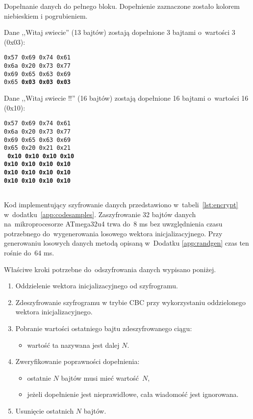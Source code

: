 \begin{table}[th]
\centering
\caption{Dopełnanie danych do pełnego bloku. Dopełnienie zaznaczone zostało kolorem niebieskiem i pogrubieniem.}
{\footnotesize Dane ,,Witaj swiecie'' (13 bajtów) zostają dopełnione 3 bajtami o~wartości 3 (0x03):}

\texttt{0x57 0x69 0x74 0x61\\
0x6a 0x20 0x73 0x77\\
0x69 0x65 0x63 0x69\\
0x65 {\color[rgb]{0,0,1}\bfseries 0x03 0x03 0x03}}

{\footnotesize Dane ,,Witaj swiecie !!'' (16 bajtów) zostają dopełnione 16 bajtami o~wartości 16 (0x10):}

\texttt{0x57 0x69 0x74 0x61\\
0x6a 0x20 0x73 0x77\\
0x69 0x65 0x63 0x69\\
0x65 0x20 0x21 0x21\\
{\color[rgb]{0,0,1}\bfseries
0x10 0x10 0x10 0x10\\
0x10 0x10 0x10 0x10\\
0x10 0x10 0x10 0x10\\
0x10 0x10 0x10 0x10\\
}
}

\label{tab:padding}
\end{table}

Kod implementujący szyfrowanie danych przedstawiono w~tabeli~\ref{lst:encrypt} w~dodatku~\ref{app:codesamples}. Zaszyfrowanie 32 bajtów danych na~mikroprocesorze ATmega32u4 trwa do~8 ms bez uwzględnienia czasu potrzebnego do~wygenerowania losowego wektora inicjalizacyjnego. Przy generowaniu losowych danych metodą opisaną w~Dodatku \ref{app:randgen} czas ten rośnie do~64 ms.

Właściwe kroki potrzebne do~odszyfrowania danych wypisano poniżej.

\begin{enumerate}
\item Oddzielenie wektora inicjalizacyjnego od szyfrogramu.
\item Zdeszyfrowanie szyfrogramu w trybie CBC przy wykorzystaniu oddzielonego wektora inicjalizacyjnego.
\item Pobranie wartości ostatniego bajtu zdeszyfrowanego ciągu:
\begin{itemize}
    \item wartość ta nazywana jest dalej $ N $.
\end{itemize}
\item Zweryfikowanie poprawności dopełnienia:
\begin{itemize}
    \item ostatnie $ N $ bajtów musi mieć wartość $ N $,
    \item jeżeli dopełnienie jest nieprawidłowe, cała wiadomość jest ignorowana.
\end{itemize}
\item Usunięcie ostatnich $ N $ bajtów.
\end{enumerate}

